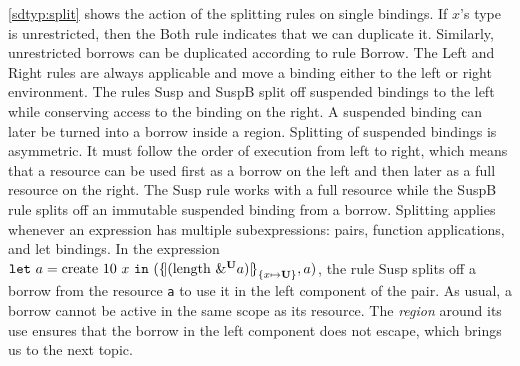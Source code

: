\cref{sdtyp:split} shows the action of the splitting rules on single
bindings. If $x$'s type is unrestricted, then
the {\sc Both} rule indicates that we can duplicate it.
Similarly, unrestricted borrows can be duplicated according to rule
{\sc Borrow}.
The {\sc Left} and {\sc Right} rules are always applicable and move a binding
either to the left or right environment.
The rules {\sc Susp} and {\sc SuspB} split off suspended bindings to
the left while conserving access to the binding on the right.
A suspended binding can later be turned
into a borrow inside a region. Splitting of suspended bindings is
asymmetric. It must follow the order of execution from left to right,
which means that a resource can be used first as a borrow on the left
and then later as a full resource on the right. The {\sc Susp} rule
works with a full resource while the {\sc SuspB}
rule splits off an immutable suspended binding from a borrow.
%
Splitting applies whenever an
expression has multiple subexpressions:  pairs, function applications,
and let bindings. In the
expression
$\letin{a}{\text{create}\ 10\ x}
{\introPair{\region[{}]{\Sone x\IBORROW}{\app{\text{length}}{\borrow[\IBORROW]{a}}}}{a}}$,
the rule {\sc Susp} splits off a borrow from  the resource
\lstinline/a/ to use it in the left component of the pair.
As usual, a borrow cannot be active in the same scope as its resource.
The \emph{region} around its use ensures that the borrow in the left component does not
escape, which brings us to the next topic.



